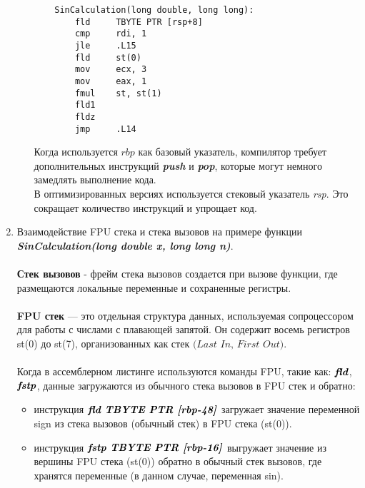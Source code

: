 \documentclass[12pt,a4paper]{article}
\numberwithin{subsection}{section}
\begin{document}
\begin{enumerate}
\begin{itemize}
    \begin{lstlisting}
    SinCalculation(long double, long long):
        fld     TBYTE PTR [rsp+8]
        cmp     rdi, 1
        jle     .L15
        fld     st(0)
        mov     ecx, 3
        mov     eax, 1
        fmul    st, st(1)
        fld1
        fldz
        jmp     .L14
    \end{lstlisting}
    
    Когда используется $\textit{rbp}$ как базовый указатель, компилятор требует дополнительных 
    инструкций \textbf{\textit{push}} и \textbf{\textit{pop}}, которые могут немного замедлять выполнение кода. 
    \\
    В оптимизированных версиях используется стековый указатель \textit{rsp}. 
    Это сокращает количество инструкций и упрощает код.


\end{itemize}

\item Взаимодействие FPU стека и стека вызовов на примере функции
\textbf{\textit{SinCalculation(long double x, long long n)}}.
\\
\\
\textbf{Стек вызовов} - фрейм стека вызовов создается при вызове функции, 
    где размещаются локальные переменные и сохраненные регистры.
\\
\\
\textbf{FPU стек} — это отдельная структура данных, 
используемая сопроцессором
для работы с числами с плавающей запятой.
Он содержит восемь регистров st(0) до st(7), 
организованных как стек $\textit{(Last In, First Out)}$.
\\
\\
Когда в ассемблерном листинге используются команды FPU, 
такие как: $\textbf{\textit{fld}}$, $\textbf{\textit{fstp}}$, 
данные загружаются из обычного стека вызовов в FPU стек и обратно:
\begin{itemize}
    \item инструкция $\textbf{\textit{fld TBYTE PTR [rbp-48]}}$ загружает значение
    переменной sign из стека вызовов (обычный стек) в  FPU стека (st(0)).
    \item инструкция $\textbf{\textit{fstp TBYTE PTR [rbp-16]}}$ выгружает значение 
    из вершины FPU стека (st(0)) обратно в обычный стек вызовов, 
    где хранятся переменные (в данном случае, переменная sin).
\end{itemize}


\end{enumerate}
\end{document}
